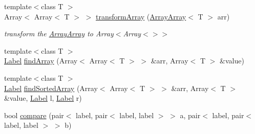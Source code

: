 \begin{DoxyCompactItemize}
{\footnotesize template$<$class T $>$ }\\Array$<$ Array$<$ T $>$ $>$ \hyperlink{namespaceHSF_a7b24373b0b6c404063e4513af006bd77}{transformArray} (\hyperlink{classHSF_1_1ArrayArray}{ArrayArray}$<$ T $>$ arr)
\begin{DoxyCompactList}\small\item\em transform the \hyperlink{classHSF_1_1ArrayArray}{ArrayArray} to Array$<$Array$<$$>$$>$ \item\end{DoxyCompactList}\item 
{\footnotesize template$<$class T $>$ }\\\hyperlink{namespaceHSF_ae65d72be782e989396ebe5ec6ae4c2b6}{Label} \hyperlink{namespaceHSF_a32f4c431a06856fabf4c7daf5631999b}{findArray} (Array$<$ Array$<$ T $>$ $>$ \&arr, Array$<$ T $>$ \&value)
\item 
{\footnotesize template$<$class T $>$ }\\\hyperlink{namespaceHSF_ae65d72be782e989396ebe5ec6ae4c2b6}{Label} \hyperlink{namespaceHSF_ae869d0d290a3d2581e48dc9a92e715bd}{findSortedArray} (Array$<$ Array$<$ T $>$ $>$ \&arr, Array$<$ T $>$ \&value, \hyperlink{namespaceHSF_ae65d72be782e989396ebe5ec6ae4c2b6}{Label} l, \hyperlink{namespaceHSF_ae65d72be782e989396ebe5ec6ae4c2b6}{Label} r)
\item 
bool \hyperlink{namespaceHSF_abf1b25a2c8c88bb66bd6d26b393092c6}{compare} (pair$<$ label, pair$<$ label, label $>$ $>$ a, pair$<$ label, pair$<$ label, label $>$ $>$ b)
\end{DoxyCompactItemize}


